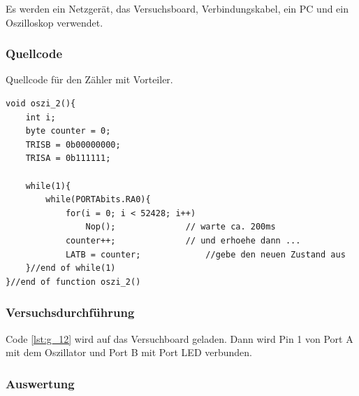 \documentclass[12pt,a4paper]{article}
\begin{document}
Es werden ein Netzgerät, das Versuchsboard, Verbindungskabel, ein PC und ein Oszilloskop verwendet.

\subsubsection*{Quellcode}

Quellcode für den Zähler mit Vorteiler.

\lstset{language=C, basicstyle=\tiny}
\begin{lstlisting}[caption = {Zähler mit Vorteiler}, label=lst:g_12,captionpos=b]
void oszi_2(){
	int i;
	byte counter = 0;
	TRISB = 0b00000000;
	TRISA = 0b111111;
	
	while(1){
		while(PORTAbits.RA0){
			for(i = 0; i < 52428; i++)
				Nop();				// warte ca. 200ms
			counter++;				// und erhoehe dann ...
			LATB = counter;				//gebe den neuen Zustand aus
	}//end of while(1)
}//end of function oszi_2()
\end{lstlisting}

\subsubsection*{Versuchsdurchführung}

Code \ref{lst:g_12} wird auf das Versuchboard geladen. Dann wird Pin 1 von Port A mit dem Oszillator und Port B mit Port LED verbunden.


\subsubsection*{Auswertung}
\end{document}

